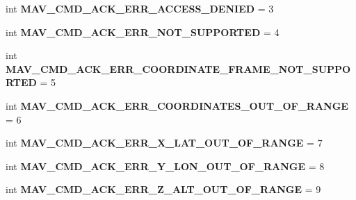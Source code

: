 \begin{DoxyCompactItemize}
\mbox{\label{namespacepymavlink_1_1dialects_1_1v10_a526f2d303be84d7e715d41b3cc9d09ad}} 
int {\bfseries M\+A\+V\+\_\+\+C\+M\+D\+\_\+\+A\+C\+K\+\_\+\+E\+R\+R\+\_\+\+A\+C\+C\+E\+S\+S\+\_\+\+D\+E\+N\+I\+ED} = 3
\item 
\mbox{\label{namespacepymavlink_1_1dialects_1_1v10_a1fe0c747e253333eeb43fa2165bc49b9}} 
int {\bfseries M\+A\+V\+\_\+\+C\+M\+D\+\_\+\+A\+C\+K\+\_\+\+E\+R\+R\+\_\+\+N\+O\+T\+\_\+\+S\+U\+P\+P\+O\+R\+T\+ED} = 4
\item 
\mbox{\label{namespacepymavlink_1_1dialects_1_1v10_a3e48c5372ac0c0dc4f170ceb05065752}} 
int {\bfseries M\+A\+V\+\_\+\+C\+M\+D\+\_\+\+A\+C\+K\+\_\+\+E\+R\+R\+\_\+\+C\+O\+O\+R\+D\+I\+N\+A\+T\+E\+\_\+\+F\+R\+A\+M\+E\+\_\+\+N\+O\+T\+\_\+\+S\+U\+P\+P\+O\+R\+T\+ED} = 5
\item 
\mbox{\label{namespacepymavlink_1_1dialects_1_1v10_a28c49613de2669378150a4f4e1de4d0c}} 
int {\bfseries M\+A\+V\+\_\+\+C\+M\+D\+\_\+\+A\+C\+K\+\_\+\+E\+R\+R\+\_\+\+C\+O\+O\+R\+D\+I\+N\+A\+T\+E\+S\+\_\+\+O\+U\+T\+\_\+\+O\+F\+\_\+\+R\+A\+N\+GE} = 6
\item 
\mbox{\label{namespacepymavlink_1_1dialects_1_1v10_a319efcf4ef68bc7c031e581b4e6f99b3}} 
int {\bfseries M\+A\+V\+\_\+\+C\+M\+D\+\_\+\+A\+C\+K\+\_\+\+E\+R\+R\+\_\+\+X\+\_\+\+L\+A\+T\+\_\+\+O\+U\+T\+\_\+\+O\+F\+\_\+\+R\+A\+N\+GE} = 7
\item 
\mbox{\label{namespacepymavlink_1_1dialects_1_1v10_a93edd0c9d9363e1142c84a0c8ad51e1b}} 
int {\bfseries M\+A\+V\+\_\+\+C\+M\+D\+\_\+\+A\+C\+K\+\_\+\+E\+R\+R\+\_\+\+Y\+\_\+\+L\+O\+N\+\_\+\+O\+U\+T\+\_\+\+O\+F\+\_\+\+R\+A\+N\+GE} = 8
\item 
\mbox{\label{namespacepymavlink_1_1dialects_1_1v10_a9688baf3344f37eede5984db327ca000}} 
int {\bfseries M\+A\+V\+\_\+\+C\+M\+D\+\_\+\+A\+C\+K\+\_\+\+E\+R\+R\+\_\+\+Z\+\_\+\+A\+L\+T\+\_\+\+O\+U\+T\+\_\+\+O\+F\+\_\+\+R\+A\+N\+GE} = 9
\item 
\mbox{\label{namespacepymavlink_1_1dialects_1_1v10_a57d52b7c8a1cf32de446e754fc698133}} 

\end{DoxyCompactItemize}

